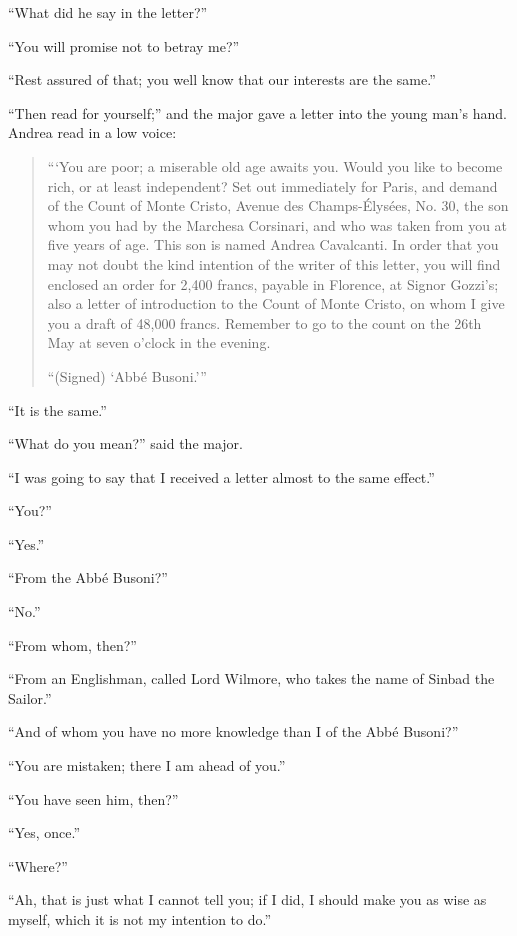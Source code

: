 “What did he say in the letter?”

“You will promise not to betray me?”

“Rest assured of that; you well know that our interests are the same.”

“Then read for yourself;” and the major gave a letter into the young
man’s hand. Andrea read in a low voice:

\begin{quote}
{\small“‘You are poor; a miserable old age awaits you. Would you like to
become rich, or at least independent? Set out immediately for Paris,
and demand of the Count of Monte Cristo, Avenue des Champs-Élysées, No.
30, the son whom you had by the Marchesa Corsinari, and who was taken
from you at five years of age. This son is named Andrea Cavalcanti. In
order that you may not doubt the kind intention of the writer of this
letter, you will find enclosed an order for 2,400 francs, payable in
Florence, at Signor Gozzi’s; also a letter of introduction to the Count
of Monte Cristo, on whom I give you a draft of 48,000 francs. Remember
to go to the count on the 26th May at seven o’clock in the evening.

\begin{flushright}
“(Signed) ‘Abbé Busoni.’”
\end{flushright}}
\end{quote}

“It is the same.”

“What do you mean?” said the major.

“I was going to say that I received a letter almost to the same
effect.”

“You?”

“Yes.”

“From the Abbé Busoni?”

“No.”

“From whom, then?”

“From an Englishman, called Lord Wilmore, who takes the name of Sinbad
the Sailor.”

“And of whom you have no more knowledge than I of the Abbé Busoni?”

“You are mistaken; there I am ahead of you.”

“You have seen him, then?”

“Yes, once.”

“Where?”

“Ah, that is just what I cannot tell you; if I did, I should make you
as wise as myself, which it is not my intention to do.”

